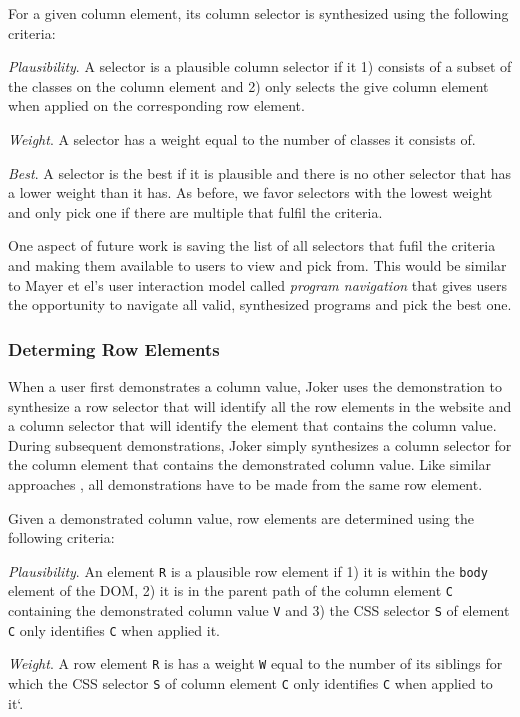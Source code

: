 \documentclass[sigconf,10pt]{acmart}
\begin{document}
For a given column element, its column selector is synthesized using the
following criteria:

\emph{Plausibility}. A selector is a plausible column selector if it 1)
consists of a subset of the classes on the column element and 2) only
selects the give column element when applied on the corresponding row
element.

\emph{Weight}. A selector has a weight equal to the number of classes it
consists of.

\emph{Best}. A selector is the best if it is plausible and there is no
other selector that has a lower weight than it has. As before, we favor
selectors with the lowest weight and only pick one if there are multiple
that fulfil the criteria.

One aspect of future work is saving the list of all selectors that fufil
the criteria and making them available to users to view and pick from.
This would be similar to Mayer et el's user interaction model called
\emph{program navigation} \citep{mayer2015} that gives users the
opportunity to navigate all valid, synthesized programs and pick the
best one.

\hypertarget{determing-row-elements}{%
\subsubsection{Determing Row Elements}\label{determing-row-elements}}

When a user first demonstrates a column value, Joker uses the
demonstration to synthesize a row selector that will identify all the
row elements in the website and a column selector that will identify the
element that contains the column value. During subsequent
demonstrations, Joker simply synthesizes a column selector for the
column element that contains the demonstrated column value. Like similar
approaches \citep{huynh2006, lin2009, chasins2018}, all demonstrations
have to be made from the same row element.

Given a demonstrated column value, row elements are determined using the
following criteria:

\emph{Plausibility}. An element \texttt{R} is a plausible row element if
1) it is within the \texttt{body} element of the DOM, 2) it is in the
parent path of the column element \texttt{C} containing the demonstrated
column value \texttt{V} and 3) the CSS selector \texttt{S} of element
\texttt{C} only identifies \texttt{C} when applied it.

\emph{Weight}. A row element \texttt{R} is has a weight \texttt{W} equal
to the number of its siblings for which the CSS selector \texttt{S} of
column element \texttt{C} only identifies \texttt{C} when applied to
it`.
\end{document}

